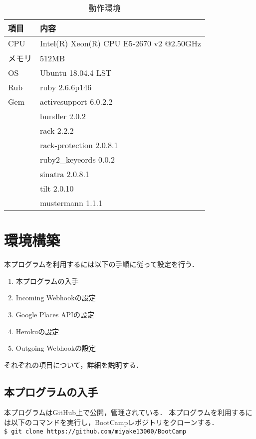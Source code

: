 \documentclass[12pt]{jsarticle}
\begin{document}
\begin{table}[tb]
  \begin{center}
    \caption{動作環境}\label{tab:env_1}
    \begin{tabular}{l|l}
      \hline\hline
      項目 & 内容 \\\hline
      CPU & Intel(R) Xeon(R) CPU E5-2670 v2 @2.50GHz\\
      メモリ & 512MB\\
      OS & Ubuntu 18.04.4 LST\\
      Rub & ruby 2.6.6p146\\
      Gem & activesupport 6.0.2.2\\
       & bundler 2.0.2\\
       & rack 2.2.2\\
       & rack-protection 2.0.8.1 \\
       & ruby2\_keyeords 0.0.2\\
       & sinatra 2.0.8.1\\
       & tilt 2.0.10\\
       & mustermann 1.1.1\\
      \hline
    \end{tabular}
  \end{center}
\end{table}


\section{環境構築}
本プログラムを利用するには以下の手順に従って設定を行う．

\begin{enumerate}
  \item 本プログラムの入手
  \item Incoming Webhookの設定
  \item Google Places APIの設定
  \item Herokuの設定　
  \item Outgoing Webhookの設定
\end{enumerate}

それぞれの項目について，詳細を説明する．

\subsection{本プログラムの入手}
本プログラムはGitHub上で公開，管理されている．
本プログラムを利用するには以下のコマンドを実行し，BootCampレポジトリをクローンする．\\
\verb|$ git clone https://github.com/miyake13000/BootCamp|
\end{document}
